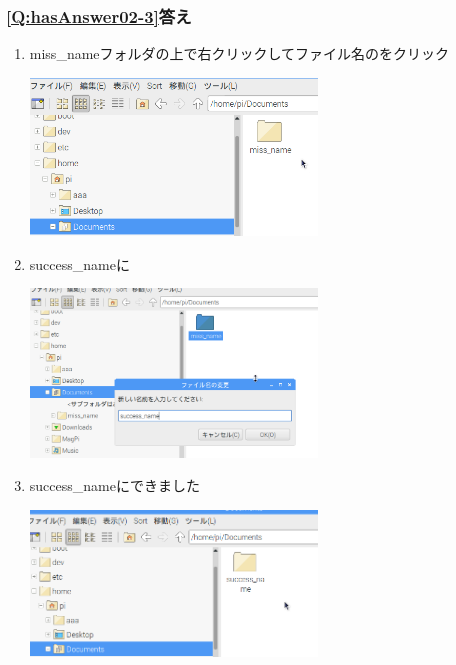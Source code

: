 \documentclass[a4paper,12pt]{jarticle}
\begin{document}
\clearpage\subsubsection{\bfseries
\ref*{Q:hasAnswer02-3}答え}


\begin{enumerate}
  \item
        miss\_nameフォルダの上で右クリックしてファイル名のをクリック

        \centering
        \includegraphics[width=0.6\textwidth]{textbook-img214.png}
        \flushleft

  \item success\_nameに

        \centering
        \includegraphics[width=0.6\textwidth]{textbook-img215.png}
        \flushleft
  \item success\_nameにできました

        \centering
        \includegraphics[width=0.6\textwidth]{textbook-img216.png}
        \flushleft
\end{enumerate}
\end{document}
